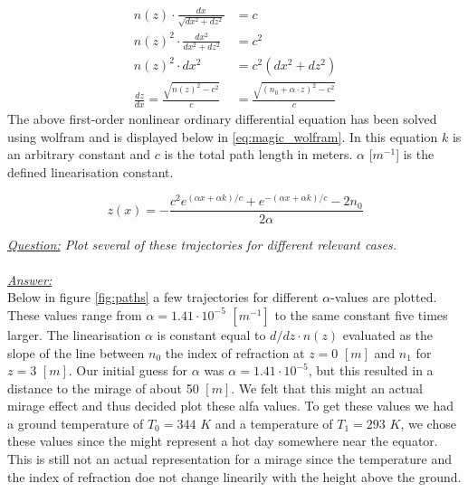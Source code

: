 \documentclass{article}
\begin{document}
\begin{align*}
	n(z)\cdot \frac{dx}{\sqrt{dx^2 + dz^2}} &= c\\
	n(z)^2 \cdot \frac{dx^2}{dx^2 + dz^2} &= c^2\\
	n(z)^2 \cdot dx^2 &= c^2(dx^2 + dz^2)\\
	\frac{dz}{dx} = \frac{\sqrt{n(z)^2 -c^2}}{c} &= \frac{\sqrt{(n_0+\alpha\cdot z)^2 -c^2}}{c}
\end{align*}
The above first-order nonlinear ordinary differential equation has been solved using wolfram and is displayed below in \ref{eq:magic_wolfram}. In this equation $k$ is an arbitrary constant and $c$ is the total path length in meters. $\alpha$ [$m^{-1}$] is the defined linearisation constant.

\begin{equation}
	z(x)=-\frac{c^2 e^{(\alpha x + \alpha k)/c}+e^{-(\alpha x + \alpha k)/c}-2n_0}{2 \alpha}
	\label{eq:magic_wolfram}
\end{equation}

\textit{\underline{Question:} Plot several of these trajectories for different relevant cases.}\\
\\
\textit{\underline{Answer:}} \\
Below in figure \ref{fig:paths} a few trajectories for different $\alpha$-values are plotted. These values range from $\alpha = 1.41 \cdot 10^{-5}$ $[m^{-1}]$ to the same constant five times larger. The linearisation $\alpha$ is constant equal to $d/dz \cdot n(z)$ evaluated as the slope of the line between $n_0$ the index of refraction at $z=0$ $[m]$ and $n_1$ for $z=3$ $[m]$. Our initial guess for $\alpha$ was $\alpha = 1.41 \cdot 10^{-5}$, but this resulted in a distance to the mirage of about 50 $[m]$. We felt that this might an actual mirage effect and thus decided plot these alfa values. To get these values we had a ground temperature of $T_0 = 344$ $K$ and a temperature of $T_1 = 293$ $K$, we chose these values since the might represent a hot day somewhere near the equator. This is still not an actual representation for a mirage since the temperature and the index of refraction doe not change linearily with the height above the ground.\\
\end{document}
